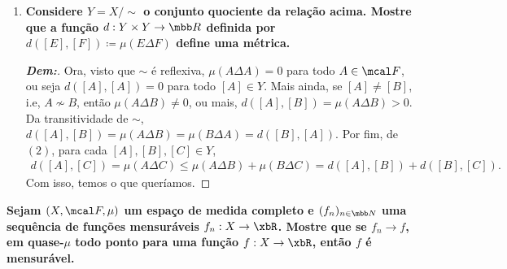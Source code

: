 \begin{enumerate}[label=(\alph*), wide, labelindent=0pt]
\begin{proof}[\textbf{Dem:}]
      \noindent 
      (Transitiva:) Sejam $A, B, C \in \mcal F$, vejamos que se $A\sim B$ e $B \sim C$, então $A \sim C$, ou seja,  
      $\mu (A\Delta C) = 0$. Note que, 
      \begin{align*}
        A\Delta C &= (A\cap C^C) \cup (C \cap A^C) = (A \cap C^C\cap(B \cup B^C)) \cup (C \cap A^C\cap(B \cup B^C))\\
        &=((A\cap C^C\cap B) \cup (A \cap C^C \cap B^C)) \cup ((C\cap A^C \cap B)\cup (C\cap A^C \cap B^C))\\
        &=((A\cap(B \setminus C))\cup(C^C\cap(A\setminus B)))\cup((C\cap(B\setminus A))\cup (A^C \cap (C \setminus B)))\\
        &\subseteq ((B\setminus C)\cup (A\setminus B))\cup ((B\setminus A) \cup (C\setminus B)) = (A\Delta B) \cup (B \Delta C).
      \end{align*}    
      Portanto, $\mu(A\Delta C) \le \mu((A\Delta B) \cup (B\Delta C)) $, $(2)$, ou seja 
      \begin{align*}
        0 \le \mu(A\Delta C) \le \mu((A\Delta B) \cup (B\Delta C)) \le \mu(A\Delta B) + \mu(B \Delta C) = 0 + 0 = 0,
      \end{align*}
      ou seja $\mu(A \Delta C) = 0$, isto é, $A \sim C$, como queríamos.
    \end{proof}
  \item \textbf{Considere $Y = X/\sim $ o conjunto quociente da 
    relação acima. Mostre que a função 
    $d: Y \times Y \rightarrow \mbb R$ definida por 
    $d([E], [F])\coloneq \mu(E \Delta F)$ define uma métrica.}
    \begin{proof}[\textbf{Dem:}]
      Ora, visto que $\sim$ é reflexiva, $\mu(A \Delta A) = 0$ para todo $A \in \mcal F$, ou seja $d([A], [A]) = 0$ para
      todo $[A] \in Y$. Mais ainda, se $[A] \neq [B]$, i.e, $A \not \sim B$, então $\mu(A\Delta B)\neq 0$, ou mais, 
      $d([A], [B]) = \mu(A \Delta B) > 0$. Da transitividade de $\sim$, $d([A], [B]) = \mu(A \Delta B) = 
      \mu(B \Delta A) = d([B], [A])$. Por fim,  de $(2)$, para cada $[A], [B], [C] \in Y$, 
      \begin{align*}
        d([A], [C]) = \mu(A \Delta C) \le \mu(A \Delta B) + \mu(B \Delta C) = d([A], [B]) + d([B], [C]).
      \end{align*}
      Com isso, temos o que queríamos.
    \end{proof}
\end{enumerate}
\biglinend
{}
\myexe{\thedois}
\bigline 
\textbf{Sejam $(X, \mcal F, \mu)$ um espaço de medida completo e $(f_n)_{n \in \mbb N}$ uma sequência de funções mensuráveis 
$f_n: X \rightarrow \xbR$. Mostre que se $f_n \rightarrow f$, em quase-$\mu$ todo ponto para uma função 
$f: X \rightarrow \xbR$, então $f$ é mensurável.}
